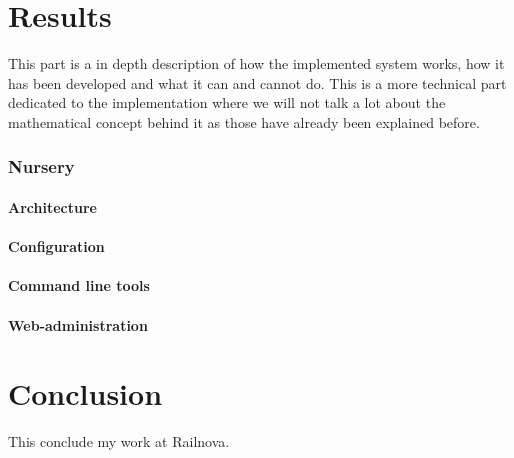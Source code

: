 \documentclass[12pt]{article}
\begin{document}
\clearpage
\part{Results}

This part is a in depth description of how the implemented system works, how it has been developed and what it can and cannot do. This is a more technical part dedicated to the implementation where we will not talk a lot about the mathematical concept behind it as those have already been explained before.\\

\clearpage
\section{Nursery}
\subsection{Architecture}
\subsection{Configuration}
\subsection{Command line tools}
\subsection{Web-administration}


\clearpage
\part{Conclusion}

This conclude my work at Railnova.
\end{document}

